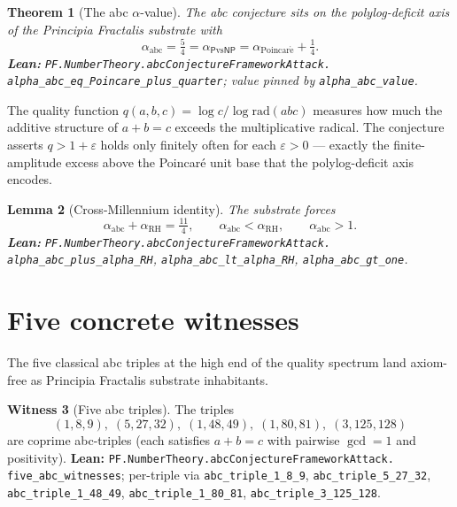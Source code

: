 \documentclass[11pt,a4paper]{article}
\theoremstyle{plain}
\newtheorem{theorem}{Theorem}[section]
\newtheorem{lemma}[theorem]{Lemma}
\theoremstyle{definition}
\newtheorem{witness}[theorem]{Witness}
\begin{document}
\begin{theorem}[The abc $\alpha$-value]
\label{thm:alpha-abc}
The abc conjecture sits on the polylog-deficit axis of the
Principia Fractalis substrate with
\[
\alpha_{\mathrm{abc}} = \tfrac{5}{4}
= \alpha_{\mathsf{P}\mathrm{vs}\mathsf{NP}}
= \alpha_{\mathrm{Poincar\acute e}} + \tfrac{1}{4}.
\]
\textbf{Lean:}
\texttt{PF.NumberTheory.abcConjectureFrameworkAttack.\\
alpha\_abc\_eq\_Poincare\_plus\_quarter}; value pinned by
\texttt{alpha\_abc\_value}.
\end{theorem}

The quality function $q(a,b,c) = \log c / \log \mathrm{rad}(abc)$
measures how much the additive structure of $a + b = c$ exceeds the
multiplicative radical. The conjecture asserts $q > 1 + \varepsilon$
holds only finitely often for each $\varepsilon > 0$ --- exactly the
finite-amplitude excess above the Poincar\'e unit base that the
polylog-deficit axis encodes.

\begin{lemma}[Cross-Millennium identity]
\label{lem:abc-eleven-fourths}
The substrate forces
\[
\alpha_{\mathrm{abc}} + \alpha_{\mathrm{RH}} = \tfrac{11}{4},
\qquad
\alpha_{\mathrm{abc}} < \alpha_{\mathrm{RH}},
\qquad
\alpha_{\mathrm{abc}} > 1.
\]
\textbf{Lean:}
\texttt{PF.NumberTheory.abcConjectureFrameworkAttack.\\
alpha\_abc\_plus\_alpha\_RH},
\texttt{alpha\_abc\_lt\_alpha\_RH},
\texttt{alpha\_abc\_gt\_one}.
\end{lemma}

\section{Five concrete witnesses}

The five classical abc triples at the high end of the quality
spectrum land axiom-free as Principia Fractalis substrate inhabitants.

\begin{witness}[Five abc triples]
\label{wit:five-abc}
The triples
\[
(1,8,9),\;(5,27,32),\;(1,48,49),\;(1,80,81),\;(3,125,128)
\]
are coprime abc-triples (each satisfies $a + b = c$ with pairwise
$\gcd = 1$ and positivity).
\textbf{Lean:}
\texttt{PF.NumberTheory.abcConjectureFrameworkAttack.\\
five\_abc\_witnesses}; per-triple via \texttt{abc\_triple\_1\_8\_9},
\texttt{abc\_triple\_5\_27\_32}, \texttt{abc\_triple\_1\_48\_49},
\texttt{abc\_triple\_1\_80\_81}, \texttt{abc\_triple\_3\_125\_128}.
\end{witness}
\end{document}
